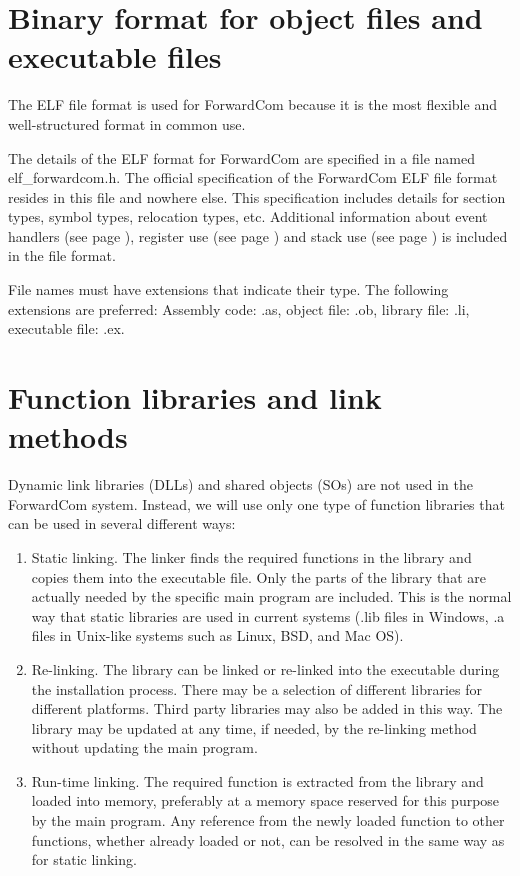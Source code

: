 \documentclass[forwardcom.tex]{subfiles}
\begin{document}
\RaggedRight

\section{Binary format for object files and executable files} \label{objectFileFormat}
The ELF file format is used for ForwardCom because it is the most flexible and well-structured format in common use.
\vv

The details of the ELF format for ForwardCom are specified in a file named elf\_forwardcom.h. The official specification of the ForwardCom ELF file format resides in this file and nowhere else. 
This specification includes details for section types, symbol types, relocation types, etc. Additional information about event handlers (see page \pageref{EventHandlers}), register use (see page \pageref{chap:registerUsageConvention}) and stack use (see page \pageref{predictingStackSize}) is included in the file format. 
\vv

File names must have extensions that indicate their type. The following extensions are preferred:  Assembly code: .as, object file: .ob, library file: .li, executable file: .ex. 
\vv

\section{Function libraries and link methods} \label{libraryLinkMethods}
Dynamic link libraries (DLLs) and shared objects (SOs) are not used in the ForwardCom system. Instead, we will use only one type of function libraries that can be used in several different ways: 

\begin{enumerate}
\item Static linking. \label{staticLinking} The linker finds the required functions in the library and copies them into the executable file. Only the parts of the library that are actually needed by the specific main program are included. This is the normal way that static libraries are used in current systems (.lib files in Windows, .a files in Unix-like systems such as Linux, BSD, and Mac OS). 

\item  Re-linking. \label{InstallationReLinking} The library can be linked or re-linked into the executable during the installation process. There may be a selection of different libraries for different platforms. Third party libraries may also be added in this way.
The library may be updated at any time, if needed, by the re-linking method without updating the main program.

\item  Run-time linking. \label{runtimeLinking} The required function is extracted from the library and loaded into memory, preferably at a memory space reserved for this purpose by the main program. Any reference from the newly loaded function to other functions, whether already loaded or not, can be resolved in the same way as for static linking. 
\end{enumerate}
\end{document}
